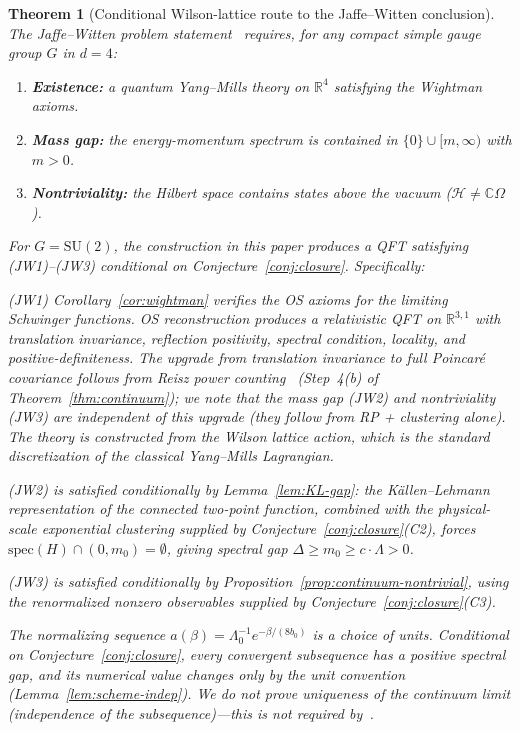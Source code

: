\documentclass[11pt]{article}
\newtheorem{theorem}{Theorem}[section]
\theoremstyle{definition}
\newcommand{\SU}{\mathrm{SU}}
\newcommand{\R}{\mathbb{R}}
\begin{document}
\begin{theorem}[Conditional Wilson-lattice route to the Jaffe--Witten conclusion]%
\label{thm:jaffe-witten}
The Jaffe--Witten problem statement~\cite{JaffeWitten} requires,
for any compact simple gauge group $G$ in $d=4$:
\begin{enumerate}[nosep,label=\textup{(JW\arabic*)}]
\item \textbf{Existence:} a quantum Yang--Mills theory on
$\R^4$ satisfying the Wightman axioms.
\item \textbf{Mass gap:} the energy-momentum spectrum is
contained in $\{0\}\cup[m,\infty)$ with $m>0$.
\item \textbf{Nontriviality:} the Hilbert space contains
states above the vacuum
\textup{(}$\mathcal{H}\ne\mathbb{C}\Omega$\textup{)}.
\end{enumerate}
For $G=\SU(2)$, the construction in this paper produces a QFT
satisfying (JW1)--(JW3) conditional on Conjecture~\ref{conj:closure}.
Specifically:

\emph{(JW1)} Corollary~\ref{cor:wightman} verifies the OS axioms
for the limiting Schwinger functions.  OS reconstruction
produces a relativistic QFT on $\R^{3,1}$ with
translation invariance, reflection positivity, spectral
condition, locality, and positive-definiteness.
The upgrade from translation invariance to full Poincar\'e
covariance follows from Reisz power counting~\cite{Reisz1988}
(Step~4(b) of Theorem~\ref{thm:continuum}); we note that
the mass gap (JW2) and nontriviality (JW3) are independent
of this upgrade (they follow from RP + clustering alone).
The theory is constructed from the Wilson lattice action,
which is the standard discretization of the classical
Yang--Mills Lagrangian.

\emph{(JW2) is satisfied conditionally} by
Lemma~\ref{lem:KL-gap}: the K\"allen--Lehmann representation of the
connected two-point function, combined with the physical-scale
exponential clustering supplied by Conjecture~\ref{conj:closure}(C2),
forces $\mathrm{spec}(H)\cap(0,m_0)=\emptyset$, giving spectral gap
$\Delta\ge m_0\ge c\cdot\Lambda>0$.

\emph{(JW3) is satisfied conditionally} by
Proposition~\ref{prop:continuum-nontrivial}, using the renormalized
nonzero observables supplied by Conjecture~\ref{conj:closure}(C3).

The normalizing sequence $a(\beta)=\Lambda_0^{-1}e^{-\beta/(8b_0)}$
is a choice of units.  Conditional on Conjecture~\ref{conj:closure}, every convergent subsequence has a positive spectral gap, and its numerical value changes only by the unit convention
\textup{(}Lemma~\ref{lem:scheme-indep}\textup{)}.
We do not prove uniqueness of the continuum limit
\textup{(}independence of the subsequence\textup{)}---this is not
required by~\cite{JaffeWitten}.
\end{theorem}
\end{document}
